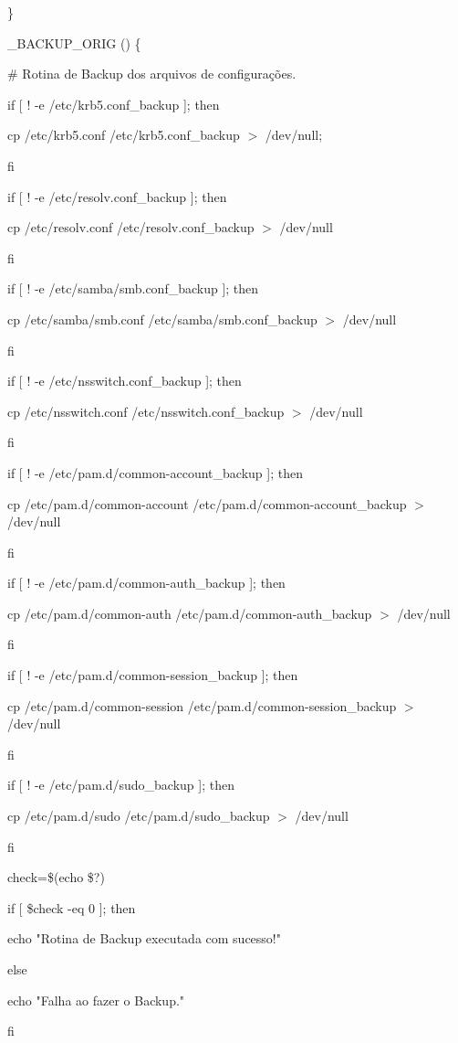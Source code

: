 \}

\_BACKUP\_ORIG () \{

  \# Rotina de Backup dos arquivos de configurações.

	if [ ! -e /etc/krb5.conf\_backup ]; then

		cp /etc/krb5.conf /etc/krb5.conf\_backup $>$ /dev/null;

	fi

	if [ ! -e /etc/resolv.conf\_backup ]; then

		cp /etc/resolv.conf /etc/resolv.conf\_backup $>$ /dev/null

	fi

	if [ ! -e /etc/samba/smb.conf\_backup ]; then

        	cp /etc/samba/smb.conf /etc/samba/smb.conf\_backup $>$ /dev/null

	fi

	if [ ! -e /etc/nsswitch.conf\_backup ]; then

        	cp /etc/nsswitch.conf /etc/nsswitch.conf\_backup $>$ /dev/null

	fi

	if [ ! -e /etc/pam.d/common-account\_backup ]; then

	        cp /etc/pam.d/common-account /etc/pam.d/common-account\_backup $>$ /dev/null

	fi

	if [ ! -e /etc/pam.d/common-auth\_backup ]; then

	        cp /etc/pam.d/common-auth /etc/pam.d/common-auth\_backup $>$ /dev/null

	fi

	if [ ! -e /etc/pam.d/common-session\_backup ]; then

	        cp /etc/pam.d/common-session /etc/pam.d/common-session\_backup $>$ /dev/null

	fi

	if [ ! -e /etc/pam.d/sudo\_backup ]; then

	        cp /etc/pam.d/sudo /etc/pam.d/sudo\_backup $>$ /dev/null

	fi
         
        check=\$(echo \$?)

   if [ \$check -eq 0 ]; then

      echo "Rotina de Backup executada com sucesso!"

   else

      echo "Falha ao fazer o Backup."

   fi
         
